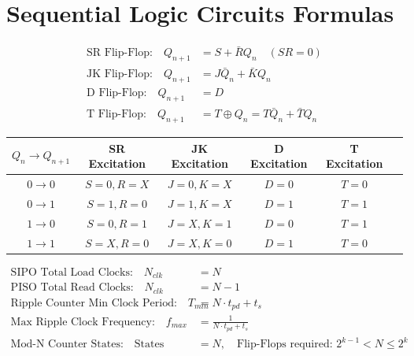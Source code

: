 \chapter{Sequential Logic Circuits Formulas}

\begin{formulabox}
\begin{align}
\text{SR Flip-Flop:} \quad Q_{n+1} &= S + \bar{R}Q_n \quad (SR=0) \\
\text{JK Flip-Flop:} \quad Q_{n+1} &= J\bar{Q}_n + \bar{K}Q_n \\
\text{D Flip-Flop:} \quad Q_{n+1} &= D \\
\text{T Flip-Flop:} \quad Q_{n+1} &= T \oplus Q_n = T\bar{Q}_n + \bar{T}Q_n
\end{align}

\begin{tabularx}{\textwidth}{c c c c c c}
\toprule
$Q_n \to Q_{n+1}$ & \textbf{SR Excitation} & \textbf{JK Excitation} & \textbf{D Excitation} & \textbf{T Excitation} \\
\midrule
$0 \to 0$ & $S=0, R=X$ & $J=0, K=X$ & $D=0$ & $T=0$ \\
$0 \to 1$ & $S=1, R=0$ & $J=1, K=X$ & $D=1$ & $T=1$ \\
$1 \to 0$ & $S=0, R=1$ & $J=X, K=1$ & $D=0$ & $T=1$ \\
$1 \to 1$ & $S=X, R=0$ & $J=X, K=0$ & $D=1$ & $T=0$ \\
\bottomrule
\end{tabularx}
\end{formulabox}

\begin{formulabox}
\begin{align}
\text{SIPO Total Load Clocks:} \quad N_{clk} &= N \\
\text{PISO Total Read Clocks:} \quad N_{clk} &= N - 1 \\
\text{Ripple Counter Min Clock Period:} \quad T_{min} &= N \cdot t_{pd} + t_s \\
\text{Max Ripple Clock Frequency:} \quad f_{max} &= \frac{1}{N \cdot t_{pd} + t_s} \\
\text{Mod-N Counter States:} \quad \text{States} &= N, \quad \text{Flip-Flops required: } 2^{k-1} < N \le 2^k
\end{align}
\end{formulabox}
